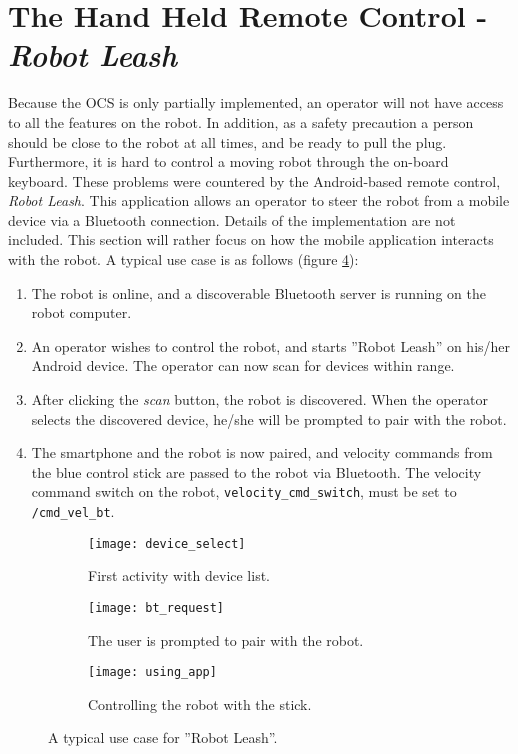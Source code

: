 \section{The Hand Held Remote Control - \textit{Robot Leash}}

Because the \ac{OCS} is only partially implemented, an operator will not have access to all the features on the robot. In addition, as a safety precaution a person should be close to the robot at all times, and be ready to pull the plug. Furthermore, it is hard to control a moving robot through the on-board keyboard. These problems were countered by the Android-based remote control, \textit{Robot Leash}. This application allows an operator to steer the robot from a mobile device via a Bluetooth connection. Details of the implementation are not included. This section will rather focus on how the mobile application interacts with the robot. A typical use case is as follows (figure \ref{fig:app_screens}):

\begin{enumerate}
	\item The robot is online, and a discoverable Bluetooth server is running on the robot computer.
	\item An operator wishes to control the robot, and starts ''Robot Leash'' on his/her Android device. The operator can now scan for devices within range.
	\item After clicking the \textit{scan} button, the robot is discovered. When the operator selects the discovered device, he/she will be prompted to pair with the robot.
	\item The smartphone and the robot is now paired, and velocity commands from the blue control stick are passed to the robot via Bluetooth. The velocity command switch on the robot, \texttt{velocity\_cmd\_switch}, must be set to \texttt{/cmd\_vel\_bt}.
\end{enumerate}

\begin{figure}[H]
	\centering
	\begin{subfigure}[b]{0.30\textwidth}
		\texttt{[image: device\_select]}
		\caption{First activity with device list.}
		\label{fig:device_select}
	\end{subfigure}
		\begin{subfigure}[b]{0.30\textwidth}
			\texttt{[image: bt\_request]}
			\caption{The user is prompted to pair with the robot.}
			\label{fig:bt_request}
		\end{subfigure}
	\begin{subfigure}[b]{0.30\textwidth}
		\texttt{[image: using\_app]}
		\caption{Controlling the robot with the stick.}
		\label{fig:using_app}
	\end{subfigure}
	\caption{\label{fig:app_screens}A typical use case for ''Robot Leash''.}
\end{figure}

